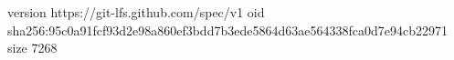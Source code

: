 version https://git-lfs.github.com/spec/v1
oid sha256:95c0a91fcf93d2e98a860ef3bdd7b3ede5864d63ae564338fca0d7e94cb22971
size 7268
